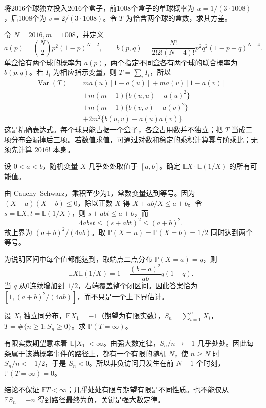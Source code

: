 \documentclass[UTF8,12pt,a4paper,fontset=fandol]{ctexbook}
\newcommand{\E}{\mathbb E}
\newcommand{\PP}{\mathbb P}
\DeclareMathOperator{\Var}{Var}
\begin{document}
\begin{example}[原题3：非均匀投球中的二球盒数]\label{yau:2016-3}
将2016个球独立投入2016个盒子，前1008个盒子的单球概率为 $u=1/(3\cdot1008)$，后1008个为 $v=2/(3\cdot1008)$。令 $T$ 为恰含两个球的盒数，求其方差。
\end{example}
\begin{solve}
令 $N=2016,m=1008$，并定义
\[
a(p)=\binom N2p^2(1-p)^{N-2},\qquad
b(p,q)=\frac{N!}{2!2!(N-4)!}p^2q^2(1-p-q)^{N-4}.
\]
单盒恰有两个球的概率为 $a(p)$，两个指定不同盒各有两个球的联合概率为 $b(p,q)$。若 $I_i$ 为相应指示变量，则 $T=\sum_iI_i$，所以
\[
\begin{aligned}
\Var(T)={}&m a(u)[1-a(u)]+m a(v)[1-a(v)]\\
&+m(m-1)\{b(u,u)-a(u)^2\}\\
&+m(m-1)\{b(v,v)-a(v)^2\}\\
&+2m^2\{b(u,v)-a(u)a(v)\}.
\end{aligned}
\]
这是精确表达式。每个球只能占据一个盒子，各盒占用数并不独立；把 $T$ 当成二项分布会漏掉后三项。若数值求值，可通过对数和稳定的乘积计算幂与阶乘比；无须先计算 $2016!$ 本身。
\end{solve}

\begin{example}[原题4：均值与倒数均值的乘积]\label{yau:2016-4}
设 $0<a<b$，随机变量 $X$ 几乎处处取值于 $[a,b]$。确定 $\E X\cdot\E(1/X)$ 的所有可能值。
\end{example}
\begin{solve}
由 Cauchy--Schwarz，乘积至少为1，常数变量达到等号。因为 $(X-a)(X-b)\le0$，除以正数 $X$ 得 $X+ab/X\le a+b$。令 $s=\E X,t=\E(1/X)$，则 $s+abt\le a+b$，而
\[
4abst\le(s+abt)^2\le(a+b)^2.
\]
故上界为 $(a+b)^2/(4ab)$。取 $\PP(X=a)=\PP(X=b)=1/2$ 同时达到两个等号。

为说明区间中每个值都能达到，取端点二点分布 $\PP(X=a)=q$，则
\[
\E X\E(1/X)=1+\frac{(b-a)^2}{ab}q(1-q).
\]
当 $q$ 从0连续增加到 $1/2$，右端覆盖整个闭区间。因此答案恰为 $[1,(a+b)^2/(4ab)]$，而不只是一个上下界估计。
\end{solve}

\begin{example}[原题5：负漂移下的非负访问次数]\label{yau:2016-5}
设 $X_i$ 独立同分布，$\E X_1=-1$（期望为有限实数），$S_n=\sum_{i=1}^nX_i$，$T=\#\{n\ge1:S_n\ge0\}$。求 $\PP(T=\infty)$。
\end{example}
\begin{solve}
有限实数期望意味着 $\E|X_1|<\infty$。由强大数定律，$S_n/n\to-1$ 几乎处处。因此每条属于该满概率事件的路径上，都有一个有限的随机 $N$，使 $n\ge N$ 时 $S_n/n<-1/2$，于是 $S_n<0$。所以非负访问只发生在前 $N-1$ 个时刻，$\PP(T=\infty)=0$。

结论不保证 $\E T<\infty$；几乎处处有限与期望有限是不同性质。也不能仅从 $\E S_n=-n$ 得到路径最终为负，关键是强大数定律。
\end{solve}
\end{document}
